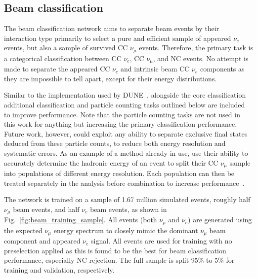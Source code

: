 \subsection{Beam classification}%
\label{sec:cnn_specific_beam} %

The beam classification network aims to separate beam events by their interaction type primarily
to select a pure and efficient sample of appeared $\nu_{e}$ events, but also a sample of survived
CC $\nu_{\mu}$ events. Therefore, the primary task is a categorical classification between CC
$\nu_{e}$, CC $\nu_{\mu}$, and NC events. No attempt is made to separate the appeared CC $\nu_{e}$
and intrinsic beam CC $\nu_{e}$ components as they are impossible to tell apart, except for their
energy distributions.

Similar to the implementation used by DUNE~\cite{collaboration2020}, alongside the core
classification additional classification and particle counting tasks outlined below are included
to improve performance. Note that the particle counting tasks are not used in this work for
anything but increasing the primary classification performance. Future work, however, could
exploit any ability to separate exclusive final states deduced from these particle counts, to
reduce both energy resolution and systematic errors. As an example of a method already in use,
\nova use their ability to accurately determine the hadronic energy of an event to split their CC
$\nu_{\mu}$ sample into populations of different energy resolution. Each population can then be
treated separately in the analysis before combination to increase performance~\cite{acero2018}.

The network is trained on a sample of 1.67 million simulated events, roughly half $\nu_{\mu}$ beam
events, and half $\nu_{e}$ beam events, as shown in Fig.~\ref{fig:beam_training_sample}. All
events (both $\nu_{\mu}$ and $\nu_{e}$) are generated using the expected \chips $\nu_{\mu}$ energy
spectrum to closely mimic the dominant $\nu_{\mu}$ beam component and appeared $\nu_{e}$ signal.
All events are used for training with no preselection applied as this is found to be the best for
beam classification performance, especially NC rejection. The full sample is split 95\% to 5\% for
training and validation, respectively.

